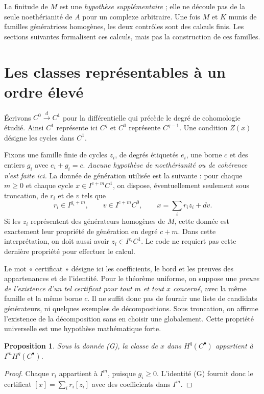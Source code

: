 \documentclass[11pt]{amsart}
\newtheorem{proposition}{Proposition}
\begin{document}
La finitude de $M$ est une \emph{hypothèse supplémentaire} ; elle ne
découle pas de la seule noethérianité de $A$ pour un complexe arbitraire.
Une fois $M$ et $K$ munis de familles génératrices homogènes, les deux
contrôles sont des calculs finis. Les sections suivantes formalisent
ces calculs, mais pas la construction de ces familles.

\section{Les classes représentables à un ordre élevé}

Écrivons $C^0\xrightarrow d C^1$ pour la différentielle qui précède
le degré de cohomologie étudié. Ainsi $C^1$ représente ici $C^q$ et
$C^0$ représente $C^{q-1}$. Une condition $Z(x)$ désigne les cycles
dans $C^1$.

Fixons une famille finie de cycles $z_i$, de degrés étiquetés $e_i$,
une borne $c$ et des entiers $g_i$ avec $e_i+g_i=c$.
\emph{Aucune hypothèse de noethérianité ou de cohérence n'est faite ici.}
La donnée de génération utilisée est la suivante : pour chaque $m\geq0$
et chaque cycle $x\in I^{c+m}C^1$, on dispose, éventuellement seulement
sous troncation, de $r_i$ et de $v$ tels que
\[
 r_i\in I^{g_i+m},\qquad v\in I^{c+m}C^0,
 \qquad x=\sum_i r_i z_i+dv.                 \tag{G}
\]
Si les $z_i$ représentent des générateurs homogènes de $M$, cette
donnée est exactement leur propriété de génération en degré $c+m$.
Dans cette interprétation, on doit aussi avoir $z_i\in I^{e_i}C^1$.
Le code ne requiert pas cette dernière propriété pour effectuer le calcul.

Le mot « certificat » désigne ici les coefficients, le bord et les
preuves des appartenances et de l'identité. Pour le théorème uniforme,
on suppose une \emph{preuve de l'existence d'un tel certificat pour
tout $m$ et tout $x$ concerné}, avec la même famille et la même borne $c$.
Il ne suffit donc pas de fournir une liste de candidats générateurs,
ni quelques exemples de décompositions. Sous troncation, on affirme
l'existence de la décomposition sans en choisir une globalement.
Cette propriété universelle est une hypothèse mathématique forte.

\begin{proposition}
Sous la donnée \textup{(G)}, la classe de $x$ dans $H^q(C^\bullet)$
appartient à $I^mH^q(C^\bullet)$.
\end{proposition}
\begin{proof}
Chaque $r_i$ appartient à $I^m$, puisque $g_i\geq0$.
L'identité (G) fournit donc le certificat
$[x]=\sum_i r_i[z_i]$ avec des coefficients dans $I^m$.
\end{proof}
\end{document}

